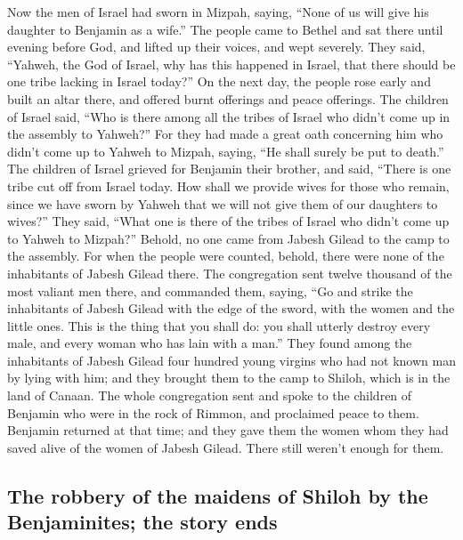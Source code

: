  Now the men of Israel had sworn in Mizpah, saying, ``None
of us will give his daughter to Benjamin as a wife.''  The
people came to Bethel and sat there until evening before God, and lifted
up their voices, and wept severely.  They said, ``Yahweh,
the God of Israel, why has this happened in Israel, that there should be
one tribe lacking in Israel today?''  On the next day, the
people rose early and built an altar there, and offered burnt offerings
and peace offerings.  The children of Israel said, ``Who
is there among all the tribes of Israel who didn't come up in the
assembly to Yahweh?'' For they had made a great oath concerning him who
didn't come up to Yahweh to Mizpah, saying, ``He shall surely be put to
death.''  The children of Israel grieved for Benjamin
their brother, and said, ``There is one tribe cut off from Israel today.
 How shall we provide wives for those who remain, since we
have sworn by Yahweh that we will not give them of our daughters to
wives?''  They said, ``What one is there of the tribes of
Israel who didn't come up to Yahweh to Mizpah?'' Behold, no one came
from Jabesh Gilead to the camp to the assembly.  For when
the people were counted, behold, there were none of the inhabitants of
Jabesh Gilead there.  The congregation sent twelve
thousand of the most valiant men there, and commanded them, saying, ``Go
and strike the inhabitants of Jabesh Gilead with the edge of the sword,
with the women and the little ones.  This is the thing
that you shall do: you shall utterly destroy every male, and every woman
who has lain with a man.''  They found among the
inhabitants of Jabesh Gilead four hundred young virgins who had not
known man by lying with him; and they brought them to the camp to
Shiloh, which is in the land of Canaan.  The whole
congregation sent and spoke to the children of Benjamin who were in the
rock of Rimmon, and proclaimed peace to them.  Benjamin
returned at that time; and they gave them the women whom they had saved
alive of the women of Jabesh Gilead. There still weren't enough for
them.

\hypertarget{the-robbery-of-the-maidens-of-shiloh-by-the-benjaminites-the-story-ends}{%
\subsection{The robbery of the maidens of Shiloh by the Benjaminites;
the story
ends}\label{the-robbery-of-the-maidens-of-shiloh-by-the-benjaminites-the-story-ends}}

